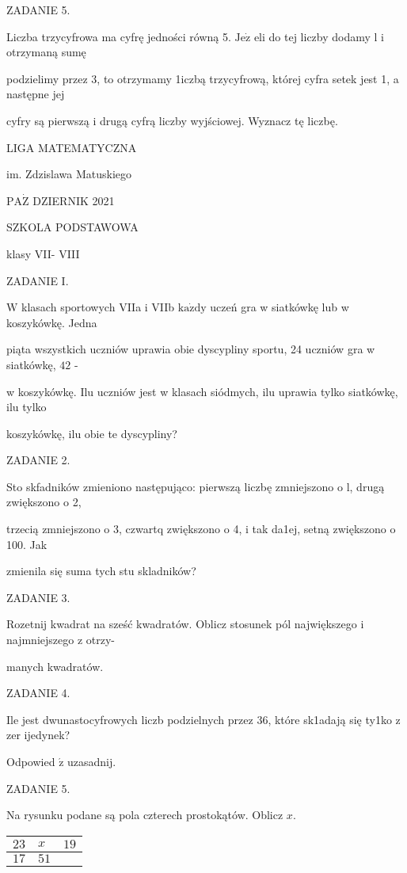 \documentclass[a4paper,12pt]{article}
\begin{document}
ZADANIE 5.

Liczba trzycyfrowa ma cyfrę jedności równą 5. $\mathrm{J}\mathrm{e}\dot{\mathrm{z}}$ eli do tej liczby dodamy l i otrzymaną sumę

podzielimy przez 3, to otrzymamy 1iczbą trzycyfrową, której cyfra setek jest 1, a następne jej

cyfry są pierwszą i drugą cyfrą liczby wyjściowej. Wyznacz tę liczbę.






LIGA MATEMATYCZNA

im. Zdzislawa Matuskiego

$\mathrm{P}\mathrm{A}\dot{\mathrm{Z}}$ DZIERNIK 2021

SZKOLA PODSTAWOWA

klasy VII- VIII

ZADANIE I.

$\mathrm{W}$ klasach sportowych VIIa i VIIb $\mathrm{k}\mathrm{a}\dot{\mathrm{z}}\mathrm{d}\mathrm{y}$ uczeń gra w siatkówkę lub w koszykówkę. Jedna

piąta wszystkich uczniów uprawia obie dyscypliny sportu, 24 uczniów gra w siatkówkę, $42$ -

w koszykówkę. Ilu uczniów jest w klasach siódmych, ilu uprawia tylko siatkówkę, ilu tylko

koszykówkę, ilu obie te dyscypliny?

ZADANIE 2.

Sto skfadników zmieniono następująco: pierwszą liczbę zmniejszono o l, drugą zwiększono o 2,

trzecią zmniejszono o 3, czwartq zwiększono o 4, i tak da1ej, setną zwiększono o 100. Jak

zmienila się suma tych stu skladników?

ZADANIE 3.

Rozetnij kwadrat na sześć kwadratów. Oblicz stosunek pól największego i najmniejszego z otrzy-

manych kwadratów.

ZADANIE 4.

Ile jest dwunastocyfrowych liczb podzielnych przez 36, które sk1adają się ty1ko z zer ijedynek?

Odpowied $\acute{\mathrm{z}}$ uzasadnij.

ZADANIE 5.

Na rysunku podane są pola czterech prostokątów. Oblicz $x.$
\begin{center}
\begin{tabular}{|l|ll|}
\hline
\multicolumn{1}{|l|}{$23$}&	\multicolumn{1}{|l|}{ $x$}&	\multicolumn{1}{|l|}{ $19$}	\\
\hline
\multicolumn{1}{|l|}{ $17$}&	\multicolumn{1}{|l}{ $51$}&	\multicolumn{1}{l|}{}	\\
\hline
\end{tabular}

\end{center}
\end{document}
